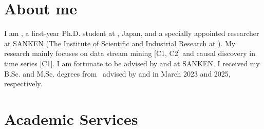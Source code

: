 \documentclass[9pt,a4paper]{article}
\begin{document}

\vspace{-1.0em}


\vspace{-1.5em}

\section{About me}
  \vspace{1.0em}
  I am \MyName, a first-year Ph.D.\! student at \OU, Japan, and a specially appointed researcher at SANKEN (The Institute of Scientific and Industrial Research at \OU).
  My research mainly focuses on data stream mining [C1, C2] and causal discovery in time series [C1].
  I am fortunate to be advised by \href{\YSakuraiURL}{\Prof{\YSakurai}} and \href{\YMatsubaraURL}{\Prof{\YMatsubara}} at SANKEN.
  I received my B.Sc.\! and M.Sc.\! degrees from \OU\ advised by \href{\MOnizukaURL}{\Prof{\MOnizuka}} and \href{\YSakuraiURL}{\Prof{\YSakurai}} in March 2023 and 2025, respectively.
  \vspace{0.2em}
  \\
  

\section{\Education}
  

\section{\Experience}
  

\section{\Awards}
  

\section{\Publications}
  

\section{Academic Services}
  
\end{document}
